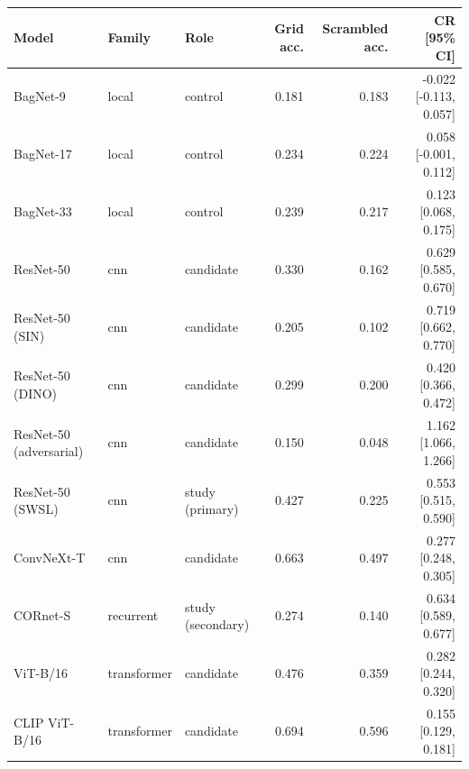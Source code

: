 \begin{tabular}{lllrrr}
\hline
Model & Family & Role & Grid acc. & Scrambled acc. & CR [95\% CI] \\
\hline
BagNet-9 & local & control & 0.181 & 0.183 & -0.022 [-0.113, 0.057] \\
BagNet-17 & local & control & 0.234 & 0.224 & 0.058 [-0.001, 0.112] \\
BagNet-33 & local & control & 0.239 & 0.217 & 0.123 [0.068, 0.175] \\
ResNet-50 & cnn & candidate & 0.330 & 0.162 & 0.629 [0.585, 0.670] \\
ResNet-50 (SIN) & cnn & candidate & 0.205 & 0.102 & 0.719 [0.662, 0.770] \\
ResNet-50 (DINO) & cnn & candidate & 0.299 & 0.200 & 0.420 [0.366, 0.472] \\
ResNet-50 (adversarial) & cnn & candidate & 0.150 & 0.048 & 1.162 [1.066, 1.266] \\
ResNet-50 (SWSL) & cnn & study (primary) & 0.427 & 0.225 & 0.553 [0.515, 0.590] \\
ConvNeXt-T & cnn & candidate & 0.663 & 0.497 & 0.277 [0.248, 0.305] \\
CORnet-S & recurrent & study (secondary) & 0.274 & 0.140 & 0.634 [0.589, 0.677] \\
ViT-B/16 & transformer & candidate & 0.476 & 0.359 & 0.282 [0.244, 0.320] \\
CLIP ViT-B/16 & transformer & candidate & 0.694 & 0.596 & 0.155 [0.129, 0.181] \\
\hline
\end{tabular}
